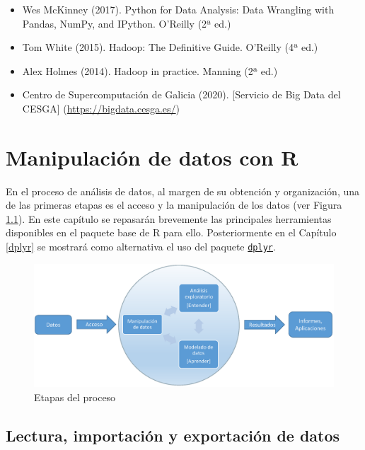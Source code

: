 \documentclass[
]{book}
\providecommand{\tightlist}{%
  \setlength{\itemsep}{0pt}\setlength{\parskip}{0pt}}
\begin{document}
\begin{itemize}
\tightlist
\item
  Wes McKinney (2017). Python for Data Analysis: Data Wrangling with Pandas, NumPy, and IPython. O'Reilly (2ª ed.)
\item
  Tom White (2015). Hadoop: The Definitive Guide. O'Reilly (4ª ed.)
\item
  Alex Holmes (2014). Hadoop in practice. Manning (2ª ed.)
\item
  Centro de Supercomputación de Galicia (2020). {[}Servicio de Big Data del CESGA{]} (\url{https://bigdata.cesga.es/})
\end{itemize}

\chapter{Manipulación de datos con R}\label{manipulaciuxf3n-de-datos-con-r}

En el proceso de análisis de datos, al margen de su obtención y organización, una de las primeras etapas es el acceso y la manipulación de los datos (ver Figura \ref{fig:esquema2}).
En este capítulo se repasarán brevemente las principales herramientas disponibles en el paquete base de R para ello.
Posteriormente en el Capítulo \ref{dplyr} se mostrará como alternativa el uso del paquete \href{https://dplyr.tidyverse.org/index.html}{\texttt{dplyr}}.

\begin{figure}[!htb]

{\centering \includegraphics[width=0.8\linewidth]{images/esquema2} 

}

\caption{Etapas del proceso}\label{fig:esquema2}
\end{figure}

\section{Lectura, importación y exportación de datos}\label{lectura-importaciuxf3n-y-exportaciuxf3n-de-datos}
\end{document}
